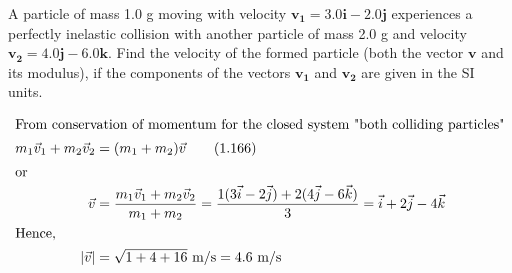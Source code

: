 \item A particle of mass 1.0 g moving with velocity $\mathbf{v_1} = 3.0\mathbf{i} - 2.0\mathbf{j}$ experiences a perfectly inelastic collision with another particle of mass 2.0 g and velocity $\mathbf{v_2} = 4.0\mathbf{j} - 6.0\mathbf{k}$. Find the velocity of the formed particle (both the vector $\mathbf{v}$ and its modulus), if the components of the vectors $\mathbf{v_1}$ and $\mathbf{v_2}$ are given in the SI units.
\begin{solution}
    \begin{align*}
        \intertext{From conservation of momentum for the closed system "both colliding particles"}
        m_1\vec{v}_1 + m_2\vec{v}_2 &= (m_1 + m_2)\vec{v} \tag{1.166}\\
        \intertext{or}
        \vec{v} &= \dfrac{m_1\vec{v}_1 + m_2\vec{v}_2}{m_1 + m_2} = 
        \dfrac{1(3\vec{i} - 2\vec{j}) + 2(4\vec{j} - 6\vec{k})}{3} = 
        \vec{i} + 2\vec{j} - 4\vec{k}\\
        \intertext{Hence,}
        |\vec{v}| &= \sqrt{1 + 4 + 16} \textup{ m/s}= 4.6 \textup{ m/s}
    \end{align*}
\end{solution}
